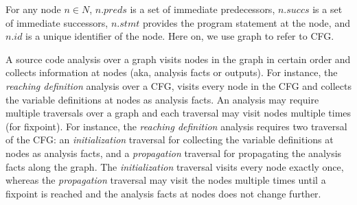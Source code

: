 % 
For any node $n \in N$, $n.preds$ is a set of immediate predecessors, $n.succs$
is a set of immediate successors, $n.stmt$ provides the program statement at the
node, and $n.id$ is a unique identifier of the node. Here on, we use graph to
refer to CFG.
% 

A source code analysis over a graph visits nodes in the graph in certain order
and collects information at nodes (aka, analysis facts or outputs). For
instance, the {\em reaching definition} analysis over a CFG, visits every node
in the CFG and collects the variable definitions at nodes as analysis facts.
An analysis may require multiple traversals over a graph and each traversal may
visit nodes multiple times (for fixpoint).
For instance, the {\em reaching definition} analysis requires two traversal of
the CFG: an {\em initialization} traversal for collecting the variable
definitions at nodes as analysis facts, and a {\em propagation} traversal for
propagating the analysis facts along the graph. The {\em initialization}
traversal visits every node exactly once, whereas the {\em propagation}
traversal may visit the nodes multiple times until a fixpoint is reached and the
analysis facts at nodes does not change further.

